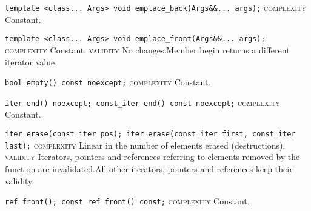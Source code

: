 \noindent{}\hspace*{0.25em}\lstinline[basicstyle=\ttfamily\color{cgreen}]{template <class... Args> void emplace_back(Args&&... args);} \textsc{complexity} Constant.\\\vspace{-0.6em}

\noindent{}\hspace*{0.25em}\lstinline[basicstyle=\ttfamily\color{cgreen}]{template <class... Args> void emplace_front(Args&&... args);} \textsc{complexity} Constant. \textsc{validity} No changes.Member begin returns a different iterator value.\\\vspace{-0.6em}

\noindent{}\hspace*{0.25em}\lstinline[basicstyle=\ttfamily\color{cgreen}]{bool empty() const noexcept;} \textsc{complexity} Constant.\\\vspace{-0.6em}

\noindent{}\hspace*{0.25em}\lstinline[basicstyle=\ttfamily\color{cgreen}]{iter end() noexcept; const_iter end() const noexcept;} \textsc{complexity} Constant.\\\vspace{-0.6em}

\noindent{}\hspace*{0.25em}\lstinline[basicstyle=\ttfamily\color{corange}]{iter erase(const_iter pos); iter erase(const_iter first, const_iter last);} \textsc{complexity} Linear in the number of elements erased (destructions). \textsc{validity} Iterators, pointers and references referring to elements removed by the function are invalidated.All other iterators, pointers and references keep their validity.\\\vspace{-0.6em}

\noindent{}\hspace*{0.25em}\lstinline[basicstyle=\ttfamily\color{cgreen}]{ref front(); const_ref front() const;} \textsc{complexity} Constant.\\\vspace{-0.6em}

